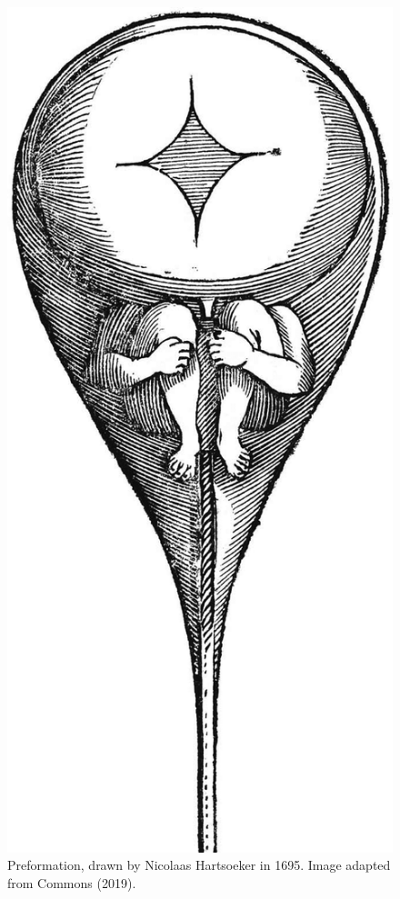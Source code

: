 \documentclass[
]{book}
\begin{document}
\begin{figure}

\hfill{}\includegraphics[width=1\linewidth]{figs/introduction/homunculus} 

\caption{Preformation, drawn by Nicolaas Hartsoeker in 1695. Image adapted from Commons (2019).}\label{fig:homunculus-pic}
\end{figure}
\end{document}
